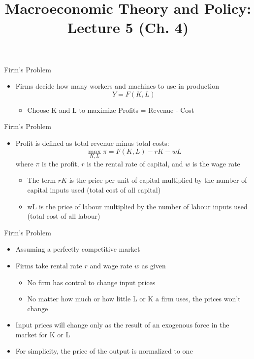 \documentclass[aspectratio=1610]{beamer}
\title[Fall - Lecture 5] %
{Macroeconomic Theory and Policy: Lecture  5 (Ch. 4)}
\author[University of Toronto] %
{}
\date[] %
\begin{document}
\begin{frame}
  \titlepage
\end{frame}

\begin{frame}[wide]{Firm's Problem}
	\begin{itemize}
		\item 	Firms decide how many workers and machines to use in production
		\[Y = F(K,L)\]
		\begin{itemize}
			\item  Choose K and L to maximize Profits = Revenue - Cost
		\end{itemize}
	\end{itemize}
\end{frame}

\begin{frame}[wide]{Firm's Problem}
	\begin{itemize}
		\item Profit is defined as total revenue minus total costs:
		\[\max_{K,L} \pi = F(K,L) - rK - wL\]
		where $\pi$ is the profit, $r$ is the rental rate of capital, and $w$ is the wage rate
		
		\begin{itemize}
			\item The term 	$rK$ is the price per unit of capital multiplied by the number of capital inputs used (total cost of all capital)
			\item wL is the price of labour multiplied by the number of labour inputs used (total cost of all labour)
		\end{itemize}
	\end{itemize}
\end{frame}

\begin{frame}[wide]{Firm's Problem}
	\begin{itemize}
		\item Assuming a perfectly competitive market
		\item Firms take rental rate $r$ and wage rate $w$ as given
		\vspace{2mm}
		\begin{itemize}
			\item No firm has control to change input prices
			\item No matter how much or how little L or K a firm uses, the prices won’t change
		\end{itemize}
		\item Input prices will change only as the result of an exogenous force in the market for K or L
		\item  For simplicity, the price of the output is normalized to one
	\end{itemize}
\end{frame}
\end{document}
